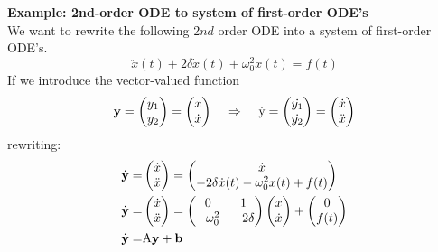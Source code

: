 \textbf{Example: 2nd-order ODE to system of first-order ODE's}\\
We want to rewrite the following 2$nd$ order ODE into a system of first-order ODE's.
\begin{equation}
  \ddot{x}(t) + 2\delta\dot{x}(t) + \omega_0^2x(t) = f(t)
\end{equation}
If we introduce the vector-valued function
\begin{equation}
  \textbf{y} = \begin{pmatrix} y_1 \\ y_2 \end{pmatrix} =
                \begin{pmatrix} x \\ \dot{x} \end{pmatrix} \;\;\;\;  \Rightarrow \;\;\;\;
                \dot{\textup{y}} =
                \begin{pmatrix} \dot{y_1} \\ \dot{y_2} \end{pmatrix} =
                \begin{pmatrix} \dot{x} \\ \ddot{x} \end{pmatrix}
\end{equation}
rewriting:
\begin{equation}
  \begin{split}
      \dot{\textbf{y}} =& \begin{pmatrix} \dot{x} \\ \ddot{x} \end{pmatrix} =
                          \begin{pmatrix} \dot{x} \\ -2\delta\dot{x}(t) - \omega_0^2x(t) + f(t) \end{pmatrix}\\
      \dot{\textbf{y}} =& \begin{pmatrix} \dot{x} \\ \ddot{x} \end{pmatrix} =
                          \begin{pmatrix} 0 & 1 \\ -\omega_0^2 & -2\delta \end{pmatrix}
                          \begin{pmatrix} x\\ \dot{x} \end{pmatrix} +
                          \begin{pmatrix} 0 \\ f(t) \end{pmatrix}\\
      \dot{\textbf{y}} =& \textup{A}\textbf{y} + \mathbf{b}
  \end{split}
\end{equation}

